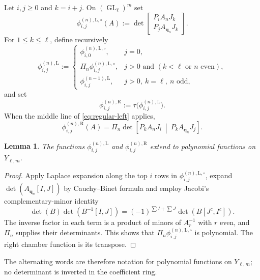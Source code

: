 \documentclass[11pt]{amsart}
\newtheorem{lemma}[theorem]{Lemma}
\theoremstyle{definition}
\theoremstyle{remark}
\newcommand{\GL}{\operatorname{GL}}
\begin{document}
Let $i,j\ge0$ and $k=i+j$.  On $(\GL_\ell)^m$ set
\begin{equation}
 \phi_{i,j}^{(n),\mathrm L,\circ}(A)
 :=\det
 \begin{bmatrix}
  P_iA_nJ_k\\[1mm]
  P_jA_{\mathbf q_n}J_k
 \end{bmatrix}.
 \label{eq:left-chamber-determinant}
\end{equation}
For $1\le k\le\ell$, define recursively
\begin{equation}
 \phi_{i,j}^{(n),\mathrm L}:=
 \begin{cases}
  \phi_{i,0}^{(n),\mathrm L,\circ},&j=0,\\[1mm]
  \Pi_n\phi_{i,j}^{(n),\mathrm L,\circ},
    &j>0\text{ and }(k<\ell\text{ or }n\text{ even}),\\[1mm]
  \phi_{i,j}^{(n-1),\mathrm L},
    &j>0,\ k=\ell,\ n\text{ odd},
 \end{cases}
 \label{eq:regular-left}
\end{equation}
and set
\begin{equation}
 \phi_{i,j}^{(n),\mathrm R}:=\tau
 \bigl(\phi_{i,j}^{(n),\mathrm L}\bigr).
 \label{eq:regular-right}
\end{equation}
When the middle line of \eqref{eq:regular-left} applies,
\begin{equation}
 \phi_{i,j}^{(n),\mathrm R}(A)
 =\Pi_n\det\left[
  P_kA_nJ_i\ \middle|\ P_kA_{\overleftarrow{\mathbf q_n}}J_j
 \right].
 \label{eq:right-formula}
\end{equation}

\begin{lemma}\label{lem:denominator-clearing}
The functions $\phi_{i,j}^{(n),\mathrm L}$ and
$\phi_{i,j}^{(n),\mathrm R}$ extend to polynomial functions on
$Y_{\ell,m}$.
\end{lemma}

\begin{proof}
Apply Laplace expansion along the top $i$ rows in $\phi_{i,j}^{(n),\mathrm L,\circ}$, expand $\det(A_{\mathbf q_n}[I,J])$ by Cauchy--Binet formula and employ Jacobi's complementary-minor identity
\[ \det(B)\det(B^{-1}[I,J]) =(-1)^{\sum I+\sum J}\det(B[J^c,I^c]). \]
The inverse factor in each term is a product of minors of $A_r^{-1}$ with $r$ even, and $\Pi_n$ supplies their determinants. This shows that $\Pi_n\phi_{i,j}^{(n),\mathrm L,\circ}$ is polynomial.  The
right chamber function is its transpose.
\end{proof}

The alternating words are therefore notation for polynomial functions on
$Y_{\ell,m}$; no determinant is inverted in the coefficient ring.
\end{document}

